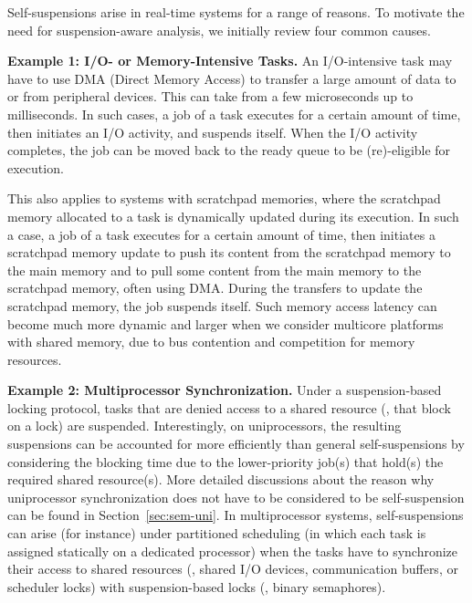 \label{sec:examples}

Self-suspensions arise in real-time systems for a range of reasons. To motivate the need for suspension-aware analysis, we initially review four common causes. 


{\bf Example 1: I/O- or Memory-Intensive Tasks.}  \hspace{0.1in}
An I/O-intensive task may have to use DMA (Direct Memory Access) to transfer a large amount of data to or from peripheral devices. This can take from a few microseconds up to milliseconds. In such cases, a job of a task executes for a certain amount of time, then initiates an I/O activity, and suspends itself. When the I/O activity completes, the job can be moved back to the ready queue to be (re)-eligible for execution. 

This also applies to systems with scratchpad memories, where the scratchpad memory allocated to a task is dynamically updated during its execution. In such a case, a job of a task executes for a certain amount of time, then initiates a scratchpad memory update to push its content from the scratchpad memory to the main memory and to pull some content from the main memory to the scratchpad memory, often using DMA. During the transfers to update the scratchpad memory, the job suspends itself. Such memory access latency can become much more dynamic and larger when we consider multicore platforms with shared memory, due to bus contention and competition for memory resources.

{\bf Example 2: Multiprocessor Synchronization.} \hspace{0.1in}
Under a suspension-based locking protocol, tasks that are denied access to a shared resource (\ie, that block on a lock) are suspended. Interestingly, on uniprocessors, the resulting suspensions can be accounted for more efficiently than general self-suspensions by considering the blocking time due to the lower-priority job(s) that hold(s) the required shared resource(s). More detailed discussions about the reason why uniprocessor synchronization does not have to be considered to be self-suspension can be found in Section~\ref{sec:sem-uni}. In multiprocessor systems, self-suspensions can arise (for instance) under partitioned scheduling (in which each task is assigned statically on a dedicated processor) when the tasks have to synchronize their access to shared resources (\eg, shared I/O devices, communication buffers, or scheduler locks) with suspension-based locks (\eg, binary semaphores). 


